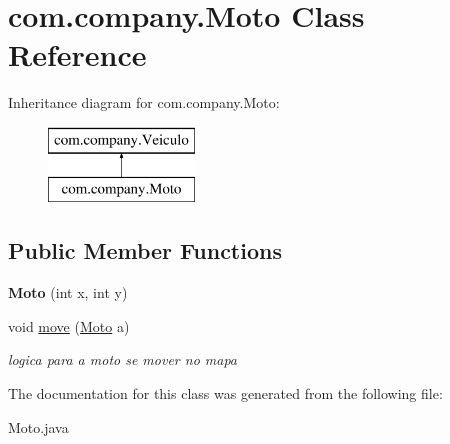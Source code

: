 \hypertarget{classcom_1_1company_1_1_moto}{}\section{com.\+company.\+Moto Class Reference}
\label{classcom_1_1company_1_1_moto}
Inheritance diagram for com.\+company.\+Moto\+:\begin{figure}[H]
\begin{center}
\leavevmode
\includegraphics[height=2.000000cm]{classcom_1_1company_1_1_moto}
\end{center}
\end{figure}
\subsection*{Public Member Functions}
\begin{DoxyCompactItemize}
\item 
\mbox{\label{classcom_1_1company_1_1_moto_a515d5ceb54df30829f64bec34f052d38}} 
{\bfseries Moto} (int x, int y)
\item 
\mbox{\label{classcom_1_1company_1_1_moto_a6dd391cc77dd0cac8fc670a5b93e4b0d}} 
void \mbox{\hyperlink{classcom_1_1company_1_1_moto_a6dd391cc77dd0cac8fc670a5b93e4b0d}{move}} (\mbox{\hyperlink{classcom_1_1company_1_1_moto}{Moto}} a)
\begin{DoxyCompactList}\small\item\em logica para a moto se mover no mapa \end{DoxyCompactList}\end{DoxyCompactItemize}


The documentation for this class was generated from the following file\+:\begin{DoxyCompactItemize}
\item 
Moto.\+java\end{DoxyCompactItemize}
